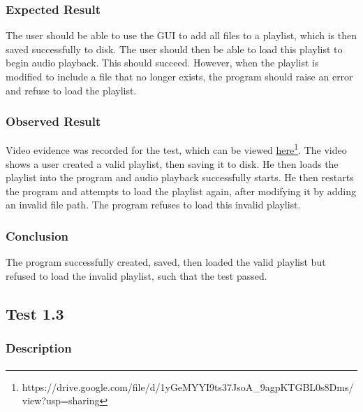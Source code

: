 \subsubsection{Expected Result}
The user should be able to use the GUI to add all files to a playlist, which is then saved successfully to disk. The user should then be able to load this playlist to begin audio playback. This should succeed. However, when the playlist is modified to include a file that no longer exists, the program should raise an error and refuse to load the playlist.

\subsubsection{Observed Result}
Video evidence was recorded for the test, which can be viewed \href{https://drive.google.com/file/d/1yGeMYYI9ts37JsoA_9agpKTGBL0s8Dms/view?usp=sharing}{here}\footnote{
	https://drive.google.com/file/d/1yGeMYYI9ts37JsoA\_9agpKTGBL0s8Dms/view?usp=sharing
}.  The video shows a user created a valid playlist, then saving it to disk. He then loads the playlist into the program and audio playback successfully starts. He then restarts the program and attempts to load the playlist again, after modifying it by adding an invalid file path. The program refuses to load this invalid playlist.

\subsubsection{Conclusion}
The program successfully created, saved, then loaded the valid playlist but refused to load the invalid playlist, such that the test passed.

\pagebreak
\subsection{Test 1.3}
\subsubsection{Description}
\paragraph{}
{
	\centering
}

